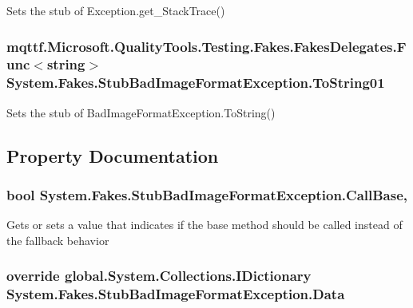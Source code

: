 Sets the stub of Exception.\-get\-\_\-\-Stack\-Trace()

\hypertarget{class_system_1_1_fakes_1_1_stub_bad_image_format_exception_a0e343c3f0ba454847559770022933efa}{
\subsubsection[{To\-String01}]{\setlength{\rightskip}{0pt plus 5cm}mqttf.\-Microsoft.\-Quality\-Tools.\-Testing.\-Fakes.\-Fakes\-Delegates.\-Func$<$string$>$ System.\-Fakes.\-Stub\-Bad\-Image\-Format\-Exception.\-To\-String01}}\label{class_system_1_1_fakes_1_1_stub_bad_image_format_exception_a0e343c3f0ba454847559770022933efa}


Sets the stub of Bad\-Image\-Format\-Exception.\-To\-String()



\subsection{Property Documentation}
\hypertarget{class_system_1_1_fakes_1_1_stub_bad_image_format_exception_ab74ecadc40546822d11174403f896fc9}{
\subsubsection[{Call\-Base}]{\setlength{\rightskip}{0pt plus 5cm}bool System.\-Fakes.\-Stub\-Bad\-Image\-Format\-Exception.\-Call\-Base\hspace{0.3cm}{\ttfamily [get]}, {\ttfamily [set]}}}\label{class_system_1_1_fakes_1_1_stub_bad_image_format_exception_ab74ecadc40546822d11174403f896fc9}


Gets or sets a value that indicates if the base method should be called instead of the fallback behavior

\hypertarget{class_system_1_1_fakes_1_1_stub_bad_image_format_exception_aea03c21179ff3ee34d61f81549f0e873}{
\subsubsection[{Data}]{\setlength{\rightskip}{0pt plus 5cm}override global.\-System.\-Collections.\-I\-Dictionary System.\-Fakes.\-Stub\-Bad\-Image\-Format\-Exception.\-Data\hspace{0.3cm}{\ttfamily [get]}}}\label{class_system_1_1_fakes_1_1_stub_bad_image_format_exception_aea03c21179ff3ee34d61f81549f0e873}


